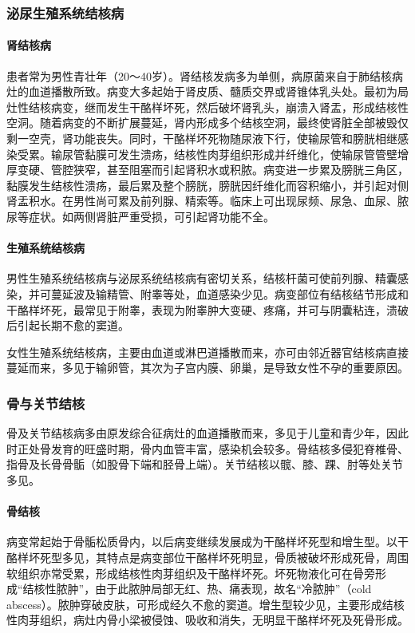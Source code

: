 \subsubsection{泌尿生殖系统结核病}

\paragraph{肾结核病}
患者常为男性青壮年（20～40岁）。肾结核发病多为单侧，病原菌来自于肺结核病灶的血道播散所致。病变大多起始于肾皮质、髓质交界或肾锥体乳头处。最初为局灶性结核病变，继而发生干酪样坏死，然后破坏肾乳头，崩溃入肾盂，形成结核性空洞。随着病变的不断扩展蔓延，肾内形成多个结核空洞，最终使肾脏全部被毁仅剩一空壳，肾功能丧失。同时，干酪样坏死物随尿液下行，使输尿管和膀胱相继感染受累。输尿管黏膜可发生溃疡，结核性肉芽组织形成并纤维化，使输尿管管壁增厚变硬、管腔狭窄，甚至阻塞而引起肾积水或积脓。病变进一步累及膀胱三角区，黏膜发生结核性溃疡，最后累及整个膀胱，膀胱因纤维化而容积缩小，并引起对侧肾盂积水。在男性尚可累及前列腺、精索等。临床上可出现尿频、尿急、血尿、脓尿等症状。如两侧肾脏严重受损，可引起肾功能不全。

\paragraph{生殖系统结核病}
男性生殖系统结核病与泌尿系统结核病有密切关系，结核杆菌可使前列腺、精囊感染，并可蔓延波及输精管、附睾等处，血道感染少见。病变部位有结核结节形成和干酪样坏死，最常见于附睾，表现为附睾肿大变硬、疼痛，并可与阴囊粘连，溃破后引起长期不愈的窦道。

女性生殖系统结核病，主要由血道或淋巴道播散而来，亦可由邻近器官结核病直接蔓延而来，多见于输卵管，其次为子宫内膜、卵巢，是导致女性不孕的重要原因。

\subsubsection{骨与关节结核}

骨及关节结核病多由原发综合征病灶的血道播散而来，多见于儿童和青少年，因此时正处骨发育的旺盛时期，骨内血管丰富，感染机会较多。骨结核多侵犯脊椎骨、指骨及长骨骨骺（如股骨下端和胫骨上端）。关节结核以髋、膝、踝、肘等处关节多见。

\paragraph{骨结核}
病变常起始于骨骺松质骨内，以后病变继续发展成为干酪样坏死型和增生型。以干酪样坏死型多见，其特点是病变部位干酪样坏死明显，骨质被破坏形成死骨，周围软组织亦常受累，形成结核性肉芽组织及干酪样坏死。坏死物液化可在骨旁形成“结核性脓肿”，由于此脓肿局部无红、热、痛表现，故名“冷脓肿”（cold
abscess）。脓肿穿破皮肤，可形成经久不愈的窦道。增生型较少见，主要形成结核性肉芽组织，病灶内骨小梁被侵蚀、吸收和消失，无明显干酪样坏死及死骨形成。

